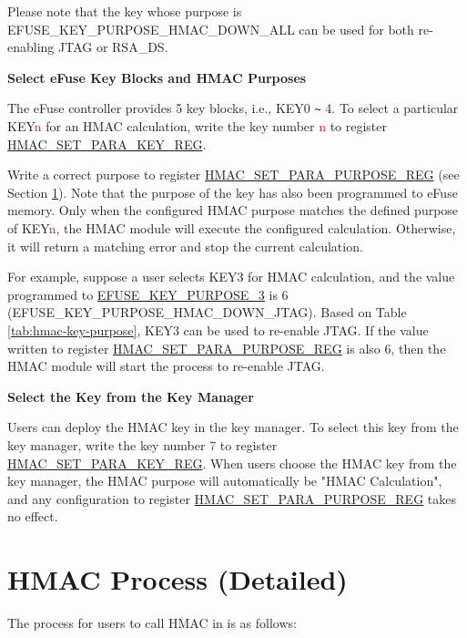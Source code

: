 \documentclass[main\_\_EN.tex]{subfiles}
\begin{document}
Please note that the key whose purpose is EFUSE\_KEY\_PURPOSE\_HMAC\_DOWN\_ALL can be used for both re-enabling JTAG or RSA\_DS.



\textbf{Select eFuse Key Blocks and HMAC Purposes}
\label{sec:hmac-config-purposes}

The eFuse controller provides 5 key blocks, i.e., KEY0 \verb+~+ 4. To select a particular KEY\textcolor{red}{n} for an HMAC calculation, write the key number \textcolor{red}{n} to register \hyperref[regdesc:HMACSETPARAKEYREG]{HMAC\_SET\_PARA\_KEY\_REG}.

Write a correct purpose to register \hyperref[regdesc:HMACSETPARAPURPOSEREG]{HMAC\_SET\_PARA\_PURPOSE\_REG} (see Section \ref{sec:hmac-process-detailed}). Note that the purpose of the key has also been programmed to eFuse memory. Only when the configured HMAC purpose matches the defined purpose of KEY\textcolor{red}{n}, the HMAC module will execute the configured calculation. Otherwise, it will return a matching error and stop the current calculation.

For example, suppose a user selects KEY3 for HMAC calculation, and the value programmed to \hyperref[fielddesc:EFUSEKEYPURPOSE3]{EFUSE\_KEY\_PURPOSE\_3} is 6 (EFUSE\_KEY\_PURPOSE\_HMAC\_DOWN\_JTAG). Based on Table \ref{tab:hmac-key-purpose}, KEY3 can be used to re-enable JTAG. If the value written to register \hyperref[regdesc:HMACSETPARAPURPOSEREG]{HMAC\_SET\_PARA\_PURPOSE\_REG} is also 6, then the HMAC module will start the process to re-enable JTAG.

\textbf{Select the Key from the Key Manager\\}
\label{sec:hmac-config-km-key}

Users can deploy the HMAC key in the key manager. To select this key from the key manager, write the key number \textcolor{red}{7} to register \hyperref[regdesc:HMACSETPARAKEYREG]{HMAC\_SET\_PARA\_KEY\_REG}. When users choose the HMAC key from the key manager, the HMAC purpose will automatically be "HMAC Calculation", and any configuration to register \hyperref[regdesc:HMACSETPARAPURPOSEREG]{HMAC\_SET\_PARA\_PURPOSE\_REG} takes no effect.

\section{HMAC Process (Detailed)}
\label{sec:hmac-process-detailed}

The process for users to call HMAC in \chipname{} is as follows:
\end{document}
